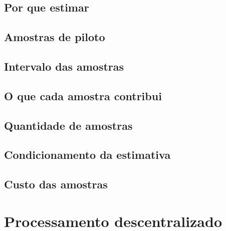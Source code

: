 \subsection{Por que estimar}
\subsection{Amostras de piloto}
\subsection{Intervalo das amostras}
\subsection{O que cada amostra contribui}
\subsection{Quantidade de amostras}
\subsection{Condicionamento da estimativa}\label{subsec:condicionamento-R}
\subsection{Custo das amostras}

\section{Processamento descentralizado}\label{sec:dbp}

